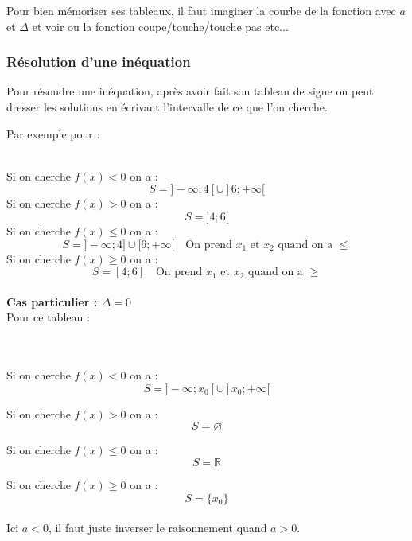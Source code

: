 \documentclass{article}
\begin{document}
	Pour bien mémoriser ses tableaux, il faut imaginer la courbe de la fonction avec $a$ et $\Delta$ et voir ou la fonction coupe/touche/touche pas etc...
	
	\subsubsection{Résolution d'une inéquation}
	
	Pour résoudre une inéquation, après avoir fait son tableau de signe on peut dresser les solutions en écrivant l'intervalle de ce que l'on cherche.
	
	\noindent Par exemple pour :\\
	\\
	
	\noindent Si on cherche $f(x) < 0$ on a :
	\[
		S = ]-\infty;4[\cup]6;+\infty[
	\]
	\noindent Si on cherche $f(x) > 0$ on a :
	\[
	S = ]4;6[
	\]
	\noindent Si on cherche $f(x) \leq 0$ on a :
	\[
	S = ]-\infty;4]\cup[6;+\infty[ \quad \text{On prend $x_1$ et $x_2$ quand on a $\leq$}
	\]
	\noindent Si on cherche $f(x) \geq 0$ on a :
	\[
	S = [4;6] \quad \text{On prend $x_1$ et $x_2$ quand on a $\geq$}
	\]\\
	
	
	\textbf{Cas particulier : $\Delta = 0$}\\
	Pour ce tableau : \\\\
	\\
	
	\noindent Si on cherche $f(x) < 0$ on a :
	\[
	S = ]-\infty;x_0[ \cup ]x_0;+\infty[
	\]
	
	\noindent Si on cherche $f(x) > 0$ on a :
	\[
	S = \varnothing
	\]
	
	\noindent Si on cherche $f(x) \leq 0$ on a :
	\[
	S = \mathbb{R}
	\]
	
	\noindent Si on cherche $f(x) \geq 0$ on a :
	\[
	S = \{ x_0 \}
	\]\\
	
	\noindent Ici $a < 0$, il faut juste inverser le raisonnement quand $a > 0$.\\
	
\end{document}
